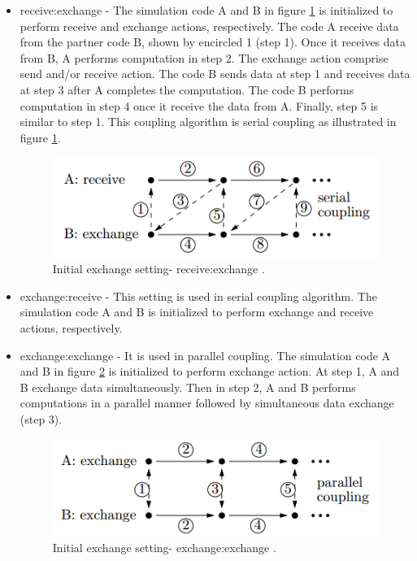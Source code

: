 \begin{itemize}

\item receive:exchange - The simulation code A and B in figure \ref{Fig:receiveexchange} is initialized to perform receive and exchange actions, respectively. The code A receive data from the partner code B, shown by encircled 1 (step 1). Once it receives data from B, A performs computation in step 2. The exchange action comprise send and/or receive action. The code B sends data at step 1 and receives data at step 3 after A completes the computation. The code B performs computation in step 4 once it receive the data from A. Finally, step 5 is similar to step 1. This coupling algorithm is serial coupling as illustrated in figure \ref{Fig:receiveexchange}.

\begin{figure}[!ht]
\centering
\includegraphics[width=\textwidth]{images/IE1.png}
\captionsetup{justification=justified}
\caption[Initial exchange setting- receive:exchange]{Initial exchange setting- receive:exchange \cite{MpCCI_documentation}.}
\label{Fig:receiveexchange}
\end{figure}

\item exchange:receive - This setting is used in serial coupling algorithm. The simulation code A and B is initialized to perform exchange and receive actions, respectively.

\item exchange:exchange - It is used in parallel coupling. The simulation code A and B in figure \ref{Fig:exchangeexchange} is initialized to perform exchange action. At step 1, A and B exchange data simultaneously. Then in step 2, A and B performs computations in a parallel manner followed by simultaneous data exchange (step 3).

\begin{figure}[!ht]
\centering
\includegraphics[width=\textwidth]{images/IE2.png}
\captionsetup{justification=justified}
\caption[Initial exchange setting- exchange:exchange]{Initial exchange setting- exchange:exchange \cite{MpCCI_documentation}.}
\label{Fig:exchangeexchange}
\end{figure}

\end{itemize}

